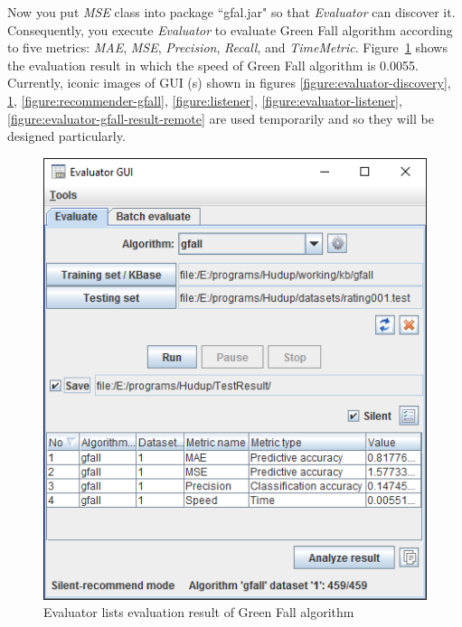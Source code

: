 \documentclass[a4paper,twoside]{article}
\begin{document}
Now you put \textit{MSE} class into package ``gfal.jar" so that \textit{Evaluator} can discover it. Consequently, you execute \textit{Evaluator} to evaluate Green Fall algorithm according to five metrics: \textit{MAE}, \textit{MSE}, \textit{Precision}, \textit{Recall}, and \textit{TimeMetric}. Figure~\ref{figure:evaluator-gfall-result} shows the evaluation result in which the speed of Green Fall algorithm is 0.0055. Currently, iconic images of GUI (s) shown in figures \ref{figure:evaluator-discovery}, \ref{figure:evaluator-gfall-result}, \ref{figure:recommender-gfall}, \ref{figure:listener}, \ref{figure:evaluator-listener}, \ref{figure:evaluator-gfall-result-remote} are used temporarily and so they will be designed particularly.
\begin{figure}
\centering
\includegraphics{EvaluatorGreenFallResult.png}
\caption{Evaluator lists evaluation result of Green Fall algorithm}
\label{figure:evaluator-gfall-result}
\end{figure}
\end{document}

